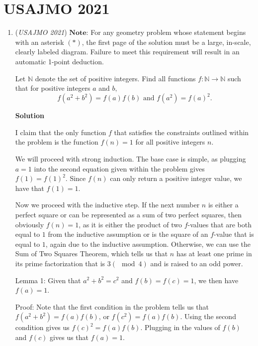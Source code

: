 \section{USAJMO 2021}
        \begin{enumerate}
        	\item (\textit{USAJMO 2021}) $\textbf{Note:}$ For any geometry problem whose statement begins with an asterisk $(*)$, the first page of the solution must be a large, in-scale, clearly labeled diagram. Failure to meet this requirement will result in an automatic 1-point deduction.


 Let $\mathbb{N}$ denote the set of positive integers. Find all functions $f : \mathbb{N} \rightarrow \mathbb{N}$ such that for positive integers $a$ and $b,$
 \[f(a^2 + b^2) = f(a)f(b) \text{ and } f(a^2) = f(a)^2.\]




\textbf{Solution}

I claim that the only function $f$ that satisfies the constraints outlined within the problem is the function $f(n) = 1$ for all positive integers $n$.

 We will proceed with strong induction. The base case is simple, as plugging $a=1$ into the second equation given within the problem gives $f(1)=f(1)^2$. Since $f(n)$ can only return a positive integer value, we have that $f(1)=1$.

 Now we proceed with the inductive step. If the next number $n$ is either a perfect square or can be represented as a sum of two perfect squares, then obviously $f(n)=1$, as it is either the product of two $f$-values that are both equal to $1$ from the inductive assumption or is the square of an $f$-value that is equal to $1$, again due to the inductive assumption. Otherwise, we can use the Sum of Two Squares Theorem, which tells us that $n$ has at least one prime in its prime factorization that is $3(\mod 4)$ and is raised to an odd power.

 Lemma 1: Given that $a^2+b^2=c^2$ and $f(b)=f(c)=1$, we then have $f(a)=1$.

 Proof: Note that the first condition in the problem tells us that $f(a^2+b^2)=f(a)f(b)$, or $f(c^2)=f(a)f(b)$. Using the second condition gives us $f(c)^2=f(a)f(b)$. Plugging in the values of $f(b)$ and $f(c)$ gives us that $f(a)=1$.


\end{enumerate}
